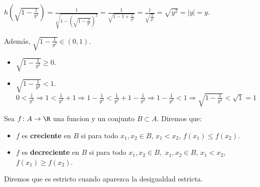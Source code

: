 \begin{example}
\begin{itemize}
		      \(h(\sqrt{1 - \frac{1}{y^{2} }} ) = \frac{1}{\sqrt{1 - (\sqrt{1 - \frac{1}{y^{2} }} )^{2} } } = \frac{1}{\sqrt{1 - 1 + \frac{1}{y^{2} }} } = \frac{1}{\sqrt{\frac{1}{y^{2}}} } = \sqrt{y^{2} } = |y| = y\).
		      
		      Además, \(\sqrt{1 - \frac{1}{y^{2} }} \in (0,1 )\).
		      \begin{itemize}
			      \item \(\sqrt{1 - \frac{1}{y^{2} }} \geq 0 \).
			      \item \(\sqrt{1 - \frac{1}{y^{2} }} < 1 \). \(0 < \frac{1}{y^{2} } \Rightarrow 1 < \frac{1}{y^{2} } + 1 \Rightarrow 1 - \frac{1}{y^{2} } < \frac{1}{y^{2} } + 1 - \frac{1}{y^{2} } \Rightarrow 1 - \frac{1}{y^{2} } < 1 \Rightarrow \sqrt{1 - \frac{1}{y^{2} }} < \sqrt{1} = 1   \)
		      \end{itemize}
	\end{itemize}
\end{example}
\begin{proposition}
	Sea \(f \colon A \to \R \) una funcion y un conjunto \(B \subset A \). Diremos que:
	\begin{itemize}
		\item \(f \) es \textbf{creciente}  en \(B \) si para todo \(x_1,x_2 \in B \), \(x_1 < x_2 \), \(f(x_1) \leq f(x_2 )\).
		\item \(f \) es \textbf{decreciente}  en \(B \) si para todo \(x_1,x_2 \in B ,\) \(x_1,x_2 \in B \), \(x_1 < x_2 \), \(f(x_1) \geq f(x_2 )\).
	\end{itemize}
	Diremos que es estricto cuando aparezca la desigualdad estricta.
\end{proposition}

